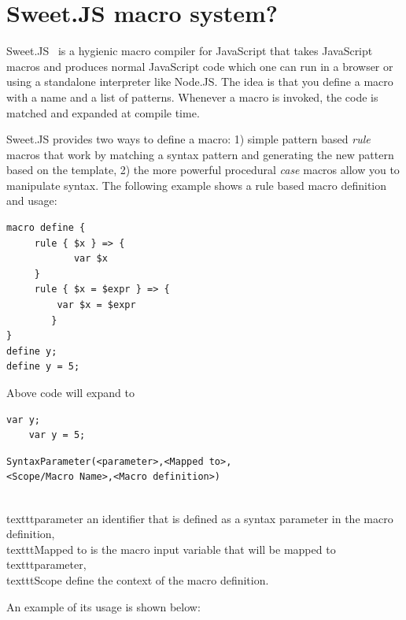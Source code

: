 \section{Sweet.JS macro system?}

Sweet.JS~\cite{bib6} is a hygienic macro compiler for JavaScript that takes JavaScript macros and produces normal JavaScript code which one can run in a browser or using a standalone interpreter like Node.JS. The idea is that you define a macro with a name and a list of patterns. Whenever a macro is invoked, the code is matched and expanded at  compile time.

Sweet.JS provides two ways to define a macro: 1) simple pattern based \textit{rule} macros that work by matching a syntax pattern and generating the new pattern based on the template, 2) the more powerful procedural \textit{case} macros allow you to manipulate syntax. The following example shows a rule based macro definition and usage:

\begin{lstlisting}[frame=single]
macro define {
   	 rule { $x } => {
   		    var $x
   	 }
   	 rule { $x = $expr } => {
   	     var $x = $expr
    	}
}
define y;
define y = 5;
\end{lstlisting}

Above code will expand to
\begin{lstlisting}[frame=single]
	var y;
	var y = 5;
\end{lstlisting}


\begin{lstlisting}[frame=single]
SyntaxParameter(<parameter>,<Mapped to>,
<Scope/Macro Name>,<Macro definition>)
\end{lstlisting}

\newpage
\\texttt{parameter} an identifier that is defined as a syntax parameter in the macro definition, \\texttt{Mapped to} is the macro input variable that will be mapped to \\texttt{parameter}, \\texttt{Scope} define the context of the macro definition.

An example of its usage is shown below:



